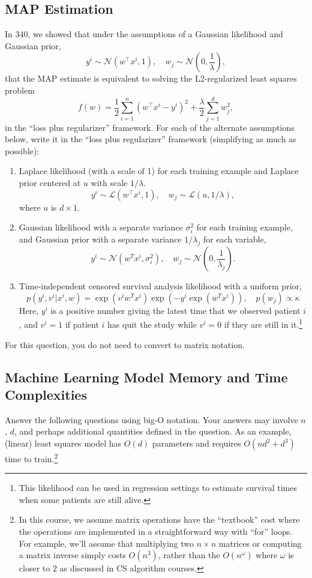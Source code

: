 \documentclass{article}
\def\blu#1{{\color{blu}#1}}
\def\enum#1{\begin{enumerate}#1\end{enumerate}}
\begin{document}
\subsection{MAP Estimation}


In 340, we showed that under the assumptions of a Gaussian likelihood and Gaussian prior,
\[
y^i \sim \mathcal{N}(w^\top x^i,1), \quad w_j \sim \mathcal{N}\left(0,\frac{1}{\lambda}\right),
\]
that the MAP estimate is equivalent to solving the L2-regularized least squares problem
\[
f(w) = \frac{1}{2}\sum_{i=1}^n (w^\top x^i - y^i)^2 + \frac \lambda 2 \sum_{j=1}^d w_j^2,
\]
in the ``loss plus regularizer'' framework.
For each of the alternate assumptions below, write it in the ``loss plus regularizer'' framework (simplifying as much as possible):
\blu{\enum{
\item Laplace likelihood (with a scale of 1) for each training example and Laplace prior centered at $u$ with scale $1/\lambda$.
\[
y^i \sim \mathcal{L}(w^\top x^i,1), \quad w_j \sim \mathcal{L}\left(u,1/\lambda\right),
\]
where $u$ is $d \times 1$.
\item Gaussian likelihood with a separate variance $\sigma_i^2$ for each training example, and Gaussian prior with a separate variance $1/\lambda_j$ for each variable,
\[
y^i \sim \mathcal{N}(w^Tx^i,\sigma_i^2), \quad w_j \sim \mathcal{N}\left(0,\frac{1}{\lambda_j}\right).
\]
\item  Time-independent censored survival analysis likelihood with a uniform prior,
\[
p(y^i, v^i | x^i, w) = \exp(v^iw^Tx^i)\exp(-y^i\exp(w^Tx^i)), \quad p(w_j) \propto \kappa
\]
Here, $y^i$ is a positive number giving the latest time that we observed patient $i$, and $v^i = 1$ if patient $i$ has quit the study while $v^i = 0$ if they are still in it.\footnote{This likelihood can be used in regression settings to estimate survival times when some patients are still alive.}
}}
For this question, you do not need to convert to matrix notation.


\subsection{Machine Learning Model Memory and Time Complexities}


Answer the following questions using big-O notation.
Your answers may involve $n$, $d$, and perhaps additional quantities defined in the question.
As an example, (linear) least squares model has $O(d)$ parameters and requires $O(nd^2 + d^3)$ time to train.\footnote{In this course, we assume matrix operations have the ``textbook'' cost where the operations are implemented in a straightforward way with ``for'' loops. For example, we'll assume that multiplying two $n \times n$ matrices or computing a matrix inverse simply costs $O(n^3)$, rather than the $O(n^\omega)$ where $\omega$ is closer to $2$ as discussed in CS algorithm courses.}
\end{document}
